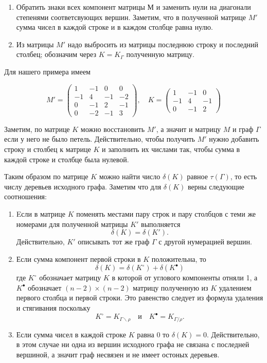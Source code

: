 \documentclass{article}
\begin{document}
\begin{enumerate}
\item Обратить знаки всех компонент матрицы $М$ и заменить нули на диагонали степенями соответсвующих вершин. Заметим, что в полученной матрице $M'$ сумма чисел в каждой строке и в каждом столбце равна нулю. 
\item Из матрицы $M'$ надо выбросить из матрицы последнюю строку и последний столбец;
обозначим через $K=K_\Gamma$ полученную матрицу.
\end{enumerate}

Для нашего примера имеем

\[M'=\left(
\begin{matrix}
1&-1&0&0
\\
-1&4&-1&-2
\\
0&-1&2&-1
\\
0&-2&-1&3
\end{matrix}\right),
\quad 
K=\left(
\begin{matrix}
1&-1&0
\\
-1&4&-1
\\
0&-1&2
\end{matrix}
\right)\]

Заметим, по матрице $K$ можно восстановить $M'$, а значит и матрицу $M$ и граф $\Gamma$ если у него не было петель.
Действительно, чтобы получить $M'$ нужно добавить строку и столбец к матрице $K$ и заполнить их числами так, чтобы сумма в каждой строке и столбце была нулевой.

Таким образом по матрице $K$ можно найти число $\delta(K)$ равное $\tau(\Gamma)$, то есть числу деревьев исходного графа.
Заметим что для $\delta(K)$ верны следующие соотношения:
\begin{enumerate}
\item Eсли в матрице $K$ поменять местами пару строк и пару столбцов с теми же номерами
для полученной матрицы $K'$ выполняется 
\[\delta(K)=\delta(K').\]
Действительно, $K'$ описывать тот же граф $\Gamma$ с другой нумерацией вершин.
\item 
Если сумма компонент первой строки в $K$ положительна, то
\[\delta(K)=\delta(K^{\circ})+\delta(K^{\bullet})\]
где $K^{\circ}$ обозначает матрицу $K$ в которой от углового компоненты отняли 1, а $K^{\bullet}$ обозначает $(n-2)\times(n-2)$ матрицу полученную из $K$ удалением первого столбца и первой строки.
Это равенство следует из формула удаления и стягивания поскольку \[K^{\circ}=K_{\Gamma\backslash\rho}\quad\text{и}\quad K^{\bullet}=K_{\Gamma/\rho}.\]
\item Если сумма чисел в каждой строке $K$ равна $0$ то $\delta(K)=0$. 
Действительно, в этом случае ни одна из вершин исходного графа не связана с последней вершиной, а значит граф несвязен и не имеет остоных деревьев.
\end{enumerate}
\end{document}
